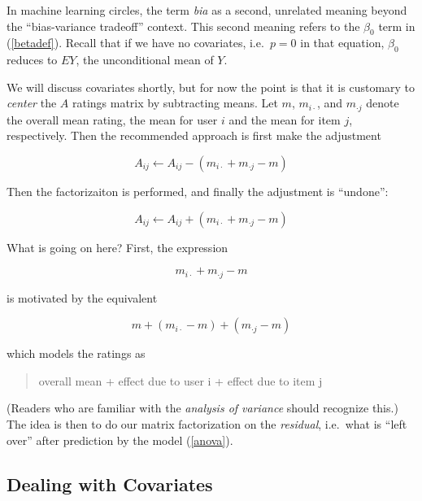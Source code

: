 In machine learning circles, the term \textit{bia} as a second,
unrelated meaning beyond the ``bias-variance tradeoff'' context.
This second meaning refers to the $\beta_0$ term in (\ref{betadef}).
Recall that if we have no covariates, i.e.\ $p = 0$ in that equation,
$\beta_0$ reduces to $EY$, the unconditional mean of $Y$.  

We will discuss covariates shortly, but for now the point is that it is
customary to \textit{center} the $A$ ratings matrix by subtracting
means.  Let $m$, $m_{i \cdot}$, and $m_{\cdot j}$ denote the overall
mean rating, the mean for user $i$ and the mean for item $j$,
respectively.  Then the recommended approach is first make the
adjustment

\begin{equation}
\label{adjust}
A_{ij} \leftarrow A_{ij} - (m_{i \cdot} + m_{\cdot j} -m)
\end{equation}

Then the factorizaiton is performed, and finally the adjustment is
``undone'':

\begin{equation}
\label{unadjust}
A_{ij} \leftarrow A_{ij} + (m_{i \cdot} + m_{\cdot j} -m)
\end{equation}

What is going on here?  First, the expression

\begin{equation}
m_{i \cdot} + m_{\cdot j} -m
\end{equation}

is motivated by the equivalent

\begin{equation}
\label{anova}
m + (m_{i \cdot} - m) + (m_{\cdot j} -m)
\end{equation}

which models the ratings as 

\begin{quote}

overall mean + effect due to user i + effect due to item j

\end{quote}

(Readers who are familiar with the \textit{analysis of variance}
should recognize this.)  The idea is then to do our matrix factorization
on the \textit{residual}, i.e.\ what is ``left over'' after prediction
by the model (\ref{anova}).

\subsection{Dealing with Covariates}

